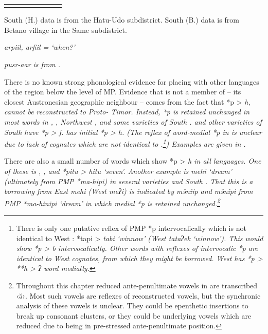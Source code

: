 \begin{table}
\begin{threeparttable}
\begin{tabular}{ll@{ }llllll}
		\lspbottomrule
	\end{tabular}
		\begin{tablenotes}\tnsize
			\item[†]	{South  (H.) data is from the Hatu-Udo subdistrict.
								South  (B.) data is from Betano village in the Same subdistrict.}
			\item[‡]	{ \it{arpiil, arfiil} = ‘when?’}
			\item[Δ]	{ \it{pusr-aar} is from   \citep{Elliot2020}.}
		\end{tablenotes}
	\end{threeparttable}
\end{table}

There is no known strong phonological evidence for placing  with other languages of the region below the level of MP.
Evidence that  is not a member of  -- its
closest Austronesian geographic neighbour -- comes from
the fact that *p > \it{h,} {\0} cannot be reconstructed to Proto- Timor.
Instead, *p is retained unchanged in most words in ,
, Northwest , and some varieties of South .
  and other varieties of South  have *p > \it{f}.
 has initial *p > \it{h}.
(The reflex of word-medial *p in  is unclear due to lack
of cognates which are not identical to .\footnote{
		There is only one putative reflex of PMP *p intervocalically which
		is not identical to West : *tapi > \it{tabi} ‘winnow’
		(West  \it{tataʔek} ‘winnow’).
		This would show *p > \it{b} intervocalically.
		Other  words with reflexes of intervocalic *p are identical
		to West  cognates, from which they might be borrowed.
		West  has *p > **h > \it{ʔ} word medially.})
Examples are given in .

There are also a small number of words which show *p > \it{h}
in all  languages.
One of these is ,
, and   *pitu > \it{hitu} ‘seven’.
Another example is \it{mehi} ‘dream’
(ultimately from PMP *ma-hipi)
in several  varieties and South .
That this is a borrowing from East  \it{mehi} (West 
\it{meʔi}) is indicated by   \it{mə̆niip}
and   \it{mə̆nipi} from PMP *ma-h\<in\>ipi ‘dream’
in which medial *p is retained unchanged.\footnote{
		Throughout this chapter reduced ante-penultimate vowels in  are transcribed ‹ə̆›.
		Most such vowels are reflexes of reconstructed vowels,
		but the synchronic analysis of these vowels is unclear.
		They could be epenthetic insertions to break up consonant clusters,
		or they could be underlying vowels which are reduced due to being
		in pre-stressed ante-penultimate position.}






